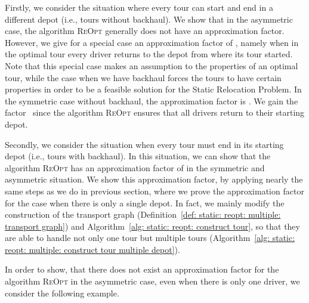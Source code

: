 \documentclass[english]{llncs}
\numberwithin{sublemma}{lemma}
\newcommand{\REOPT}{\textsc{ReOpt}\xspace}
\begin{document}
Firstly, we consider the situation where every tour can start and end in a different depot (i.e., tours without backhaul).
We show that in the asymmetric case, the algorithm \REOPT generally does not have an approximation factor.
However, we give for a special case an approximation factor of , namely when in the optimal tour every driver returns to the depot from where its tour started.
Note that this special case makes an assumption to the properties of an optimal tour,
while the case when we have backhaul forces the tours to have certain properties in order to be a feasible solution for the Static Relocation Problem.
In the symmetric case without backhaul, the approximation factor is .
We gain the factor~ since the algorithm \REOPT ensures that all drivers return to their starting depot.


Secondly, we consider the situation when every tour must end in its starting depot (i.e., tours with backhaul).
In this situation, we can show that the algorithm \REOPT has an approximation factor of  in the symmetric and asymmetric situation.
We show this approximation factor, by applying nearly the same steps as we do in previous section,
where we prove the approximation factor for the case when there is only a single depot.
In fact, we mainly modify the construction of the transport graph (Definition~\ref{def: static: reopt: multiple: transport graph}) and Algorithm~\ref{alg: static: reopt: construct tour},
so that they are able to handle not only one tour but multiple tours (Algorithm~\ref{alg: static: reopt: multiple: construct tour multiple depot}).


In order to show, that there does not exist an approximation factor for the algorithm \REOPT in the asymmetric case, even when there is only one driver, we consider the following example.
\end{document}

